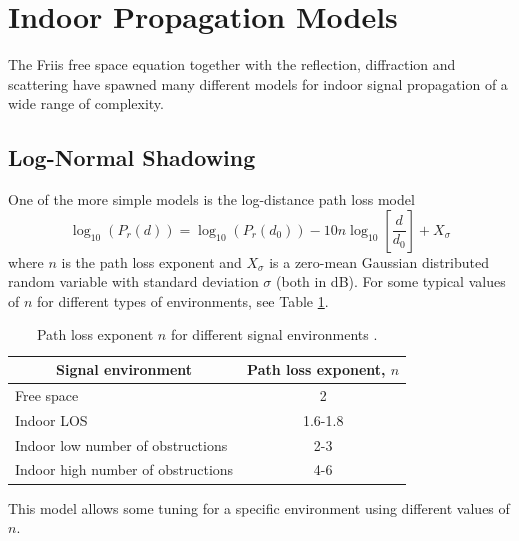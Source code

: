 \documentclass{LTHthesis}
\begin{document}
\section{Indoor Propagation Models}
%
The Friis free space equation together with the reflection, diffraction and scattering have spawned many different models for indoor signal propagation of a wide range of complexity.
%
\subsection{Log-Normal Shadowing} 
One of the more simple models is the log-distance path loss model
%
\begin{equation}
\log_{10}({P_r(d)})=\log_{10}({P_r(d_0)})-10n\log_{10}\left[{\frac{d}{d_0}}\right] + X_\sigma
\end{equation} 
%
where $n$ is the path loss exponent and  $X_\sigma$ is a zero-mean Gaussian distributed random variable with standard deviation $\sigma$ (both in dB). For some typical values of $n$ for different types of environments, see Table \ref{table:path_loss_n}.
%
\begin{table}
\begin{center}
\begin{tabular}{| l | c |}
\hline
\multicolumn{1}{|c|}{Signal environment} & Path loss exponent, $n$ \\
\hline
\hline
Free space & 2 \\
\hline
Indoor LOS & 1.6-1.8 \\
\hline
Indoor low number of obstructions & 2-3 \\
\hline
Indoor high number of obstructions & 4-6 \\
\hline
\end{tabular}
\end{center}
\caption{Path loss exponent $n$ for different signal environments \cite{rappaport96}.}
\label{table:path_loss_n}
\end{table}
%
This model allows some tuning for a specific environment using different values of $n$.
\end{document}
